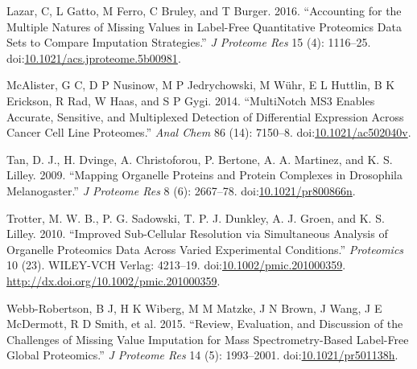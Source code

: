 Lazar, C, L Gatto, M Ferro, C Bruley, and T Burger. 2016. ``Accounting
for the Multiple Natures of Missing Values in Label-Free Quantitative
Proteomics Data Sets to Compare Imputation Strategies.'' \emph{J
Proteome Res} 15 (4): 1116--25.
doi:\href{http://dx.doi.org/10.1021/acs.jproteome.5b00981}{10.1021/acs.jproteome.5b00981}.

McAlister, G C, D P Nusinow, M P Jedrychowski, M W{ü}hr, E L Huttlin, B
K Erickson, R Rad, W Haas, and S P Gygi. 2014. ``MultiNotch MS3 Enables
Accurate, Sensitive, and Multiplexed Detection of Differential
Expression Across Cancer Cell Line Proteomes.'' \emph{Anal Chem} 86
(14): 7150--8.
doi:\href{http://dx.doi.org/10.1021/ac502040v}{10.1021/ac502040v}.

Tan, D. J., H. Dvinge, A. Christoforou, P. Bertone, A. A. Martinez, and
K. S. Lilley. 2009. ``Mapping Organelle Proteins and Protein Complexes
in Drosophila Melanogaster.'' \emph{J Proteome Res} 8 (6): 2667--78.
doi:\href{http://dx.doi.org/10.1021/pr800866n}{10.1021/pr800866n}.

Trotter, M. W. B., P. G. Sadowski, T. P. J. Dunkley, A. J. Groen, and K.
S. Lilley. 2010. ``Improved Sub-Cellular Resolution via Simultaneous
Analysis of Organelle Proteomics Data Across Varied Experimental
Conditions.'' \emph{Proteomics} 10 (23). WILEY-VCH Verlag: 4213--19.
doi:\href{http://dx.doi.org/10.1002/pmic.201000359}{10.1002/pmic.201000359}.
\url{http://dx.doi.org/10.1002/pmic.201000359}.

Webb-Robertson, B J, H K Wiberg, M M Matzke, J N Brown, J Wang, J E
McDermott, R D Smith, et al. 2015. ``Review, Evaluation, and Discussion
of the Challenges of Missing Value Imputation for Mass
Spectrometry-Based Label-Free Global Proteomics.'' \emph{J Proteome Res}
14 (5): 1993--2001.
doi:\href{http://dx.doi.org/10.1021/pr501138h}{10.1021/pr501138h}.
